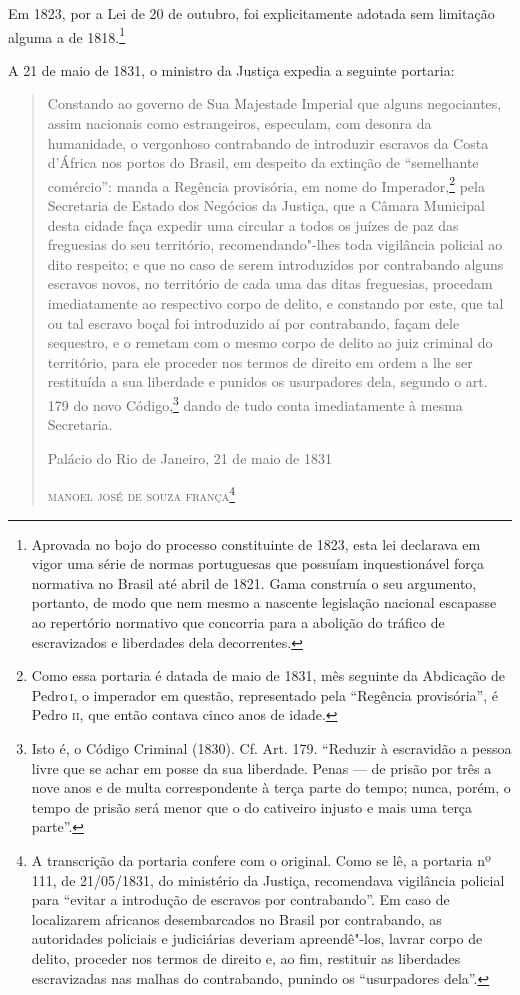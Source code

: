 Em 1823, por a Lei de 20 de outubro, foi explicitamente adotada sem
limitação alguma a de 1818.\footnote{Aprovada no bojo do processo
  constituinte de 1823, esta lei declarava em vigor uma série de normas
  portuguesas que possuíam inquestionável força normativa no Brasil até
  abril de 1821. Gama construía o seu argumento, portanto, de modo que
  nem mesmo a nascente legislação nacional escapasse ao repertório
  normativo que concorria para a abolição do tráfico de escravizados e
  liberdades dela decorrentes.}

A 21 de maio de 1831, o ministro da Justiça expedia a seguinte portaria:

\begin{quote}
Constando ao governo de Sua Majestade Imperial que alguns negociantes,
assim nacionais como estrangeiros, especulam, com desonra da humanidade,
o vergonhoso contrabando de introduzir escravos da Costa d'África nos
portos do Brasil, em despeito da extinção de ``semelhante comércio'':
manda a Regência provisória, em nome do Imperador,\footnote{Como essa
  portaria é datada de maio de 1831, mês seguinte da Abdicação de Pedro\,\textsc{i}, o imperador em questão, representado pela ``Regência provisória'', é
  Pedro \textsc{ii}, que então contava cinco anos de idade.} pela Secretaria de
Estado dos Negócios da Justiça, que a Câmara Municipal desta cidade faça
expedir uma circular a todos os juízes de paz das freguesias do seu
território, recomendando"-lhes toda vigilância policial ao dito respeito;
e que no caso de serem introduzidos por contrabando alguns escravos
novos, no território de cada uma das ditas freguesias, procedam
imediatamente ao respectivo corpo de delito, e constando por este, que
tal ou tal escravo boçal foi introduzido aí por contrabando, façam dele
sequestro, e o remetam com o mesmo corpo de delito ao juiz criminal do
território, para ele proceder nos termos de direito em ordem a lhe ser
restituída a sua liberdade e punidos os usurpadores dela, segundo o art.
179 do novo Código,\footnote{Isto é, o Código Criminal (1830). Cf. Art.
  179. ``Reduzir à escravidão a pessoa livre que se achar em posse da sua
  liberdade. Penas --- de prisão por três a nove anos e de multa
  correspondente à terça parte do tempo; nunca, porém, o tempo de prisão
  será menor que o do cativeiro injusto e mais uma terça parte''.} dando
de tudo conta imediatamente à mesma Secretaria.

\bigskip

\noindent{} Palácio do Rio de Janeiro, 21 de maio de 1831\smallskip

\noindent\textsc{manoel josé de souza frança}\footnote{A transcrição da portaria
  confere com o original. Como se lê, a portaria nº 111, de 21/05/1831,
  do ministério da Justiça, recomendava vigilância policial para ``evitar
  a introdução de escravos por contrabando''. Em caso de localizarem
  africanos desembarcados no Brasil por contrabando, as autoridades
  policiais e judiciárias deveriam apreendê"-los, lavrar corpo de
  delito, proceder nos termos de direito e, ao fim, restituir as
  liberdades escravizadas nas malhas do contrabando, punindo os
  ``usurpadores dela''.}
\end{quote}

